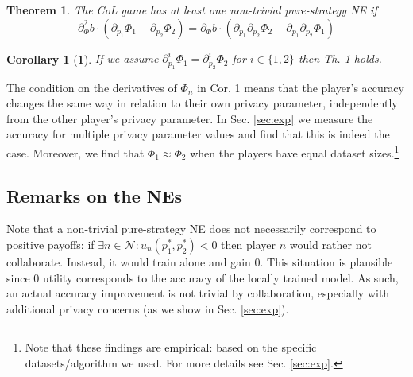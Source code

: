 \documentclass[USenglish,oneside,twocolumn]{article}
\theoremstyle{plain}
\newtheorem{theorem}{Theorem}
\newtheorem*{corollary}{Corollary}
\begin{document}
    \vspace{-0.25cm}
    \begin{theorem}
        \label{th:uc_vs_uc_gen}
        The CoL game has at least one non-trivial pure-strategy NE if
        \vspace{-0.25cm}
        \begin{equation}
        \label{eq:uc_vs_uc_gen}
        \partial^2_{\Phi}b\cdot(\partial_{p_1}\Phi_1-\partial_{p_2}\Phi_2)=\partial_{\Phi}b\cdot(\partial_{p_1}\partial_{p_2}\Phi_2-\partial_{p_1}\partial_{p_2}\Phi_1)
        \end{equation}
    \end{theorem}
    \vspace{-0.5cm}
    \begin{corollary}[\textbf{1}]
        If we assume $\partial^i_{p_1}\Phi_1=\partial^i_{p_2}\Phi_2$ for $i\in\{1,2\}$ then Th. \ref{th:uc_vs_uc_gen} holds.
    \end{corollary}
    \vspace{-0.25cm}
    
    The condition on the derivatives of $\Phi_n$ in Cor. 1 means that the player's accuracy changes the same way in relation to their own privacy parameter, independently from the other player's privacy parameter. In Sec. \ref{sec:exp} we measure the accuracy for multiple privacy parameter values and find that this is indeed the case. Moreover, we find that $\Phi_1\approx\Phi_2$ when the players have equal dataset sizes.\footnote{Note that these findings are empirical: based on the specific datasets/algorithm we used. For more details see Sec. \ref{sec:exp}.}
    
    \vspace{-0.5cm}
    \subsection{Remarks on the NEs}
    \vspace{-0.25cm}
    
    Note that a non-trivial pure-strategy NE does not necessarily correspond to positive payoffs: if $\exists n\in\mathcal{N}:u_n(p_1^*,p_2^*)<0$ then player $n$ would rather not collaborate. Instead, it would train alone and gain 0. This situation is plausible since 0 utility corresponds to the accuracy of the locally trained model. As such, an actual accuracy improvement is not trivial by collaboration, especially with additional privacy concerns (as we show in Sec. \ref{sec:exp}). 
\end{document}
